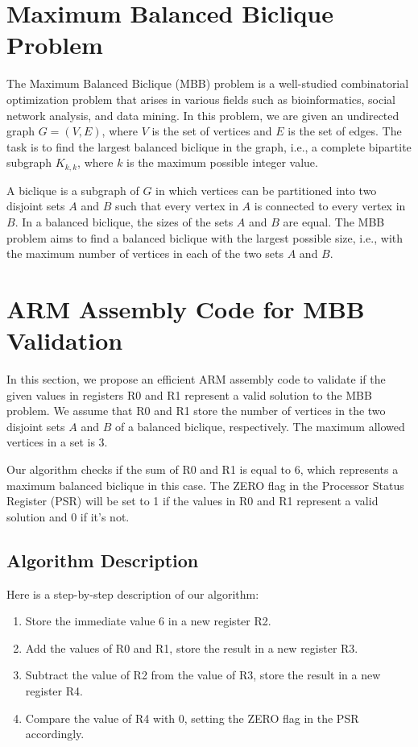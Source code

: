 \section{Maximum Balanced Biclique Problem}

The Maximum Balanced Biclique (MBB) problem is a well-studied combinatorial optimization problem that arises in various fields such as bioinformatics, social network analysis, and data mining. In this problem, we are given an undirected graph $G=(V,E)$, where $V$ is the set of vertices and $E$ is the set of edges. The task is to find the largest balanced biclique in the graph, i.e., a complete bipartite subgraph $K_{k,k}$, where $k$ is the maximum possible integer value.

A biclique is a subgraph of $G$ in which vertices can be partitioned into two disjoint sets $A$ and $B$ such that every vertex in $A$ is connected to every vertex in $B$. In a balanced biclique, the sizes of the sets $A$ and $B$ are equal. The MBB problem aims to find a balanced biclique with the largest possible size, i.e., with the maximum number of vertices in each of the two sets $A$ and $B$.

\section{ARM Assembly Code for MBB Validation}

In this section, we propose an efficient ARM assembly code to validate if the given values in registers R0 and R1 represent a valid solution to the MBB problem. We assume that R0 and R1 store the number of vertices in the two disjoint sets $A$ and $B$ of a balanced biclique, respectively. The maximum allowed vertices in a set is 3. 

Our algorithm checks if the sum of R0 and R1 is equal to 6, which represents a maximum balanced biclique in this case. The ZERO flag in the Processor Status Register (PSR) will be set to 1 if the values in R0 and R1 represent a valid solution and 0 if it's not.

\subsection{Algorithm Description}

Here is a step-by-step description of our algorithm:

\begin{enumerate}
    \item Store the immediate value 6 in a new register R2.
    \item Add the values of R0 and R1, store the result in a new register R3.
    \item Subtract the value of R2 from the value of R3, store the result in a new register R4.
    \item Compare the value of R4 with 0, setting the ZERO flag in the PSR accordingly.
\end{enumerate}

